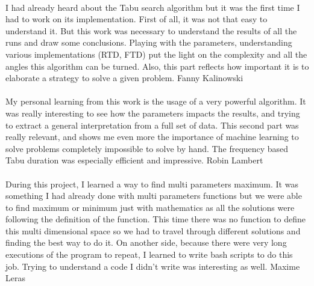 \documentclass[12pt,oneside,a4paper]{article}
\begin{document}
\paragraph{}
I had already heard about the Tabu search algorithm but it was the first time I had to work on its implementation. 
First of all, it was not that easy to understand it. 
But this work was necessary to understand the results of all the runs and draw some conclusions. 
Playing with the parameters, understanding various implementations (RTD, FTD) put the light on the complexity 
and all the angles this algorithm can be turned. Also, this part reflects how important it is to 
elaborate a strategy to solve a given problem.
Fanny Kalinowski

\paragraph{}
My personal learning from this work is the usage of a very powerful algorithm. 
It was really interesting to see how the parameters impacts the results, 
and trying to extract a general interpretation from a full set of data. 
This second part was really relevant, and shows me even more the importance of  
machine learning to solve problems completely impossible to solve by hand. 
The frequency based Tabu duration was especially efficient and impressive. Robin Lambert

\paragraph{}
During this project, I learned a way to find multi parameters maximum. It was something
I had already done with multi parameters functions but we were able to find maximum
or minimum just with mathematics as all the solutions were following the definition of the function.
This time there was no function to define this multi dimensional space so we had to travel
through different solutions and finding the best way to do it.
On another side, because there were very long executions of the program to repeat, I learned
to write bash scripts to do this job. Trying to understand a code I didn't write was interesting as well.
Maxime Leras 
\end{document}
